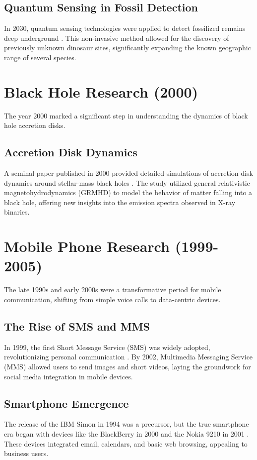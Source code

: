 \documentclass[12pt, a4paper]{article}
\begin{document}
\subsection{Quantum Sensing in Fossil Detection}
In 2030, quantum sensing technologies were applied to detect fossilized remains deep underground \cite{quantum_sensing}. This non-invasive method allowed for the discovery of previously unknown dinosaur sites, significantly expanding the known geographic range of several species.

\section{Black Hole Research (2000)}

The year 2000 marked a significant step in understanding the dynamics of black hole accretion disks.

\subsection{Accretion Disk Dynamics}
A seminal paper published in 2000 provided detailed simulations of accretion disk dynamics around stellar-mass black holes \cite{black_hole_accretion}. The study utilized general relativistic magnetohydrodynamics (GRMHD) to model the behavior of matter falling into a black hole, offering new insights into the emission spectra observed in X-ray binaries.

\section{Mobile Phone Research (1999-2005)}

The late 1990s and early 2000s were a transformative period for mobile communication, shifting from simple voice calls to data-centric devices.

\subsection{The Rise of SMS and MMS}
In 1999, the first Short Message Service (SMS) was widely adopted, revolutionizing personal communication \cite{sms_rise}. By 2002, Multimedia Messaging Service (MMS) allowed users to send images and short videos, laying the groundwork for social media integration in mobile devices.

\subsection{Smartphone Emergence}
The release of the IBM Simon in 1994 was a precursor, but the true smartphone era began with devices like the BlackBerry in 2000 and the Nokia 9210 in 2001 \cite{smartphone_emergence}. These devices integrated email, calendars, and basic web browsing, appealing to business users.
\end{document}

